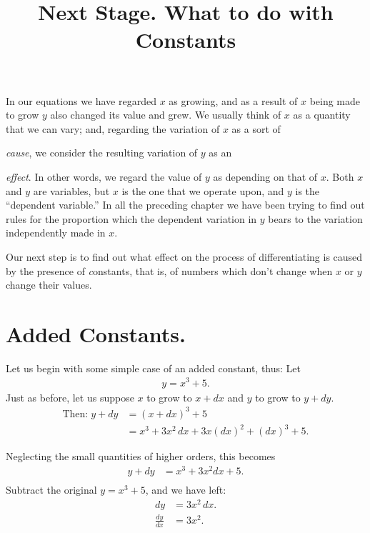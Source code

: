 \documentclass{ximera}
\begin{document}
\title{Next Stage. What to do with Constants}
\begin{abstract}
\end{abstract}
\maketitle

In our equations we have regarded $x$ as growing,
and as a result of $x$ being made to grow $y$ also
changed its value and grew. We usually think of $x$
as a quantity that we can vary; and, regarding the
variation of $x$ as a sort of {\emph{cause}, we consider the resulting
variation of $y$ as an {\emph{effect}. In other words, we
regard the value of $y$ as depending on that of $x$. Both
$x$ and $y$ are variables, but $x$ is the one that we operate
upon, and $y$ is the ``dependent variable.'' In all the
preceding chapter we have been trying to find out
rules for the proportion which the dependent variation
in $y$ bears to the variation independently made in $x$.

Our next step is to find out what effect on the
process of differentiating is caused by the presence of
{\emph constants}, that is, of numbers which don't change
when $x$ or $y$ change their values.

\section{Added Constants.} %

Let us begin with some simple case of an added
constant, thus:
Let
\begin{align*}
y=x^3+5.
\end{align*}
Just as before, let us suppose $x$ to grow to $x+dx$ and
$y$ to grow to $y+dy$.
\begin{align*}
\text{Then:}\;
 y + dy &=(x + dx)^3 + 5 \\
           &=x^3 + 3x^2\, dx + 3x(dx)^2 + (dx)^3 + 5.
\end{align*}

Neglecting the small quantities of higher orders, this
becomes
\begin{align*}
y + dy &= x^3 + 3x^2dx + 5. \\
\end{align*}
Subtract the original $y = x^3 + 5$, and we have left:
\begin{align*}
dy &= 3x^2\, dx. \\
\frac{dy}{dx} &= 3x^2.
\end{align*}

}}
\end{document}
